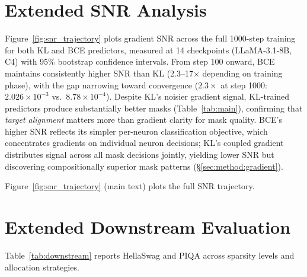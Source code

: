 \section{Extended SNR Analysis}
\label{app:snr_extended}

Figure~\ref{fig:snr_trajectory} plots gradient SNR across the full 1000-step training for both KL and BCE predictors, measured at 14 checkpoints (LLaMA-3.1-8B, C4) with 95\% bootstrap confidence intervals.
From step 100 onward, BCE maintains consistently higher SNR than KL (2.3--17$\times$ depending on training phase), with the gap narrowing toward convergence ($2.3\times$ at step 1000: $2.026{\times}10^{-3}$ vs.\ $8.78{\times}10^{-4}$).
Despite KL's noisier gradient signal, KL-trained predictors produce substantially better masks (Table~\ref{tab:main}), confirming that \emph{target alignment} matters more than gradient clarity for mask quality.
BCE's higher SNR reflects its simpler per-neuron classification objective, which concentrates gradients on individual neuron decisions; KL's coupled gradient distributes signal across all mask decisions jointly, yielding lower SNR but discovering compositionally superior mask patterns (\S\ref{sec:method:gradient}).

Figure~\ref{fig:snr_trajectory} (main text) plots the full SNR trajectory.


\section{Extended Downstream Evaluation}
\label{app:downstream}

Table~\ref{tab:downstream} reports HellaSwag and PIQA across sparsity levels and allocation strategies.

\begin{table}[h]
\centering
\caption{Extended downstream benchmarks (LLaMA-3.1-8B). HellaSwag: 10-shot normalized acc; PIQA: 0-shot normalized acc. KL 30\% uniform: 3-seed mean$\pm$std; others: seed 42.}
\label{tab:downstream}
\end{table}

